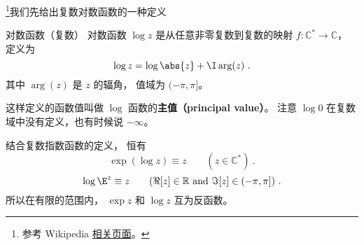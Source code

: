 
\begin{issues}
\issueDraft
\end{issues}


\footnote{参考 Wikipedia \href{https://en.wikipedia.org/wiki/Complex_logarithm}{相关页面}。}我们先给出复数对数函数的一种定义
\begin{definition}{对数函数（复数）}
对数函数 $\log z$ 是从任意非零复数到复数的映射 $f:\mathbb C^*\to \mathbb C$， 定义为
\begin{equation}
\log z = \log\abs{z} + \I \arg(z)~.
\end{equation}
其中 $\arg(z)$ 是 $z$ 的辐角， 值域为 $(-\pi, \pi]$。
\end{definition}
这样定义的函数值叫做 $\log$ 函数的\textbf{主值（principal value）}。 注意 $\log 0$ 在复数域中没有定义，也有时候说 $-\infty$。

结合复数指数函数的定义， 恒有
\begin{equation}
\exp(\log z) \equiv z \qquad (z \in \mathbb C^*)~.
\end{equation}
\begin{equation}
\log \E^z \equiv z \qquad (\Re[z]\in\mathbb R \text{ and } \Im[z]\in(-\pi, \pi])~.
\end{equation}
所以在有限的范围内， $\exp z$ 和 $\log z$ 互为反函数。
